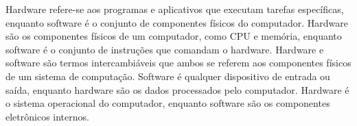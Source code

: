 \documentclass[a4paper,12pt,table]{exam}
\begin{document}
\begin{questions}
{\begin{randomizechoices}
\choice Hardware refere-se aos programas e aplicativos que executam tarefas específicas, enquanto software é o conjunto de componentes físicos do computador.
\CorrectChoice Hardware são os componentes físicos de um computador, como CPU e memória, enquanto software é o conjunto de instruções que comandam o hardware.
\choice Hardware e software são termos intercambiáveis que ambos se referem aos componentes físicos de um sistema de computação.
\choice Software é qualquer dispositivo de entrada ou saída, enquanto hardware são os dados processados pelo computador.
\choice Hardware é o sistema operacional do computador, enquanto software são os componentes eletrônicos internos.
\end{randomizechoices}
}
\end{questions}
\end{document}
